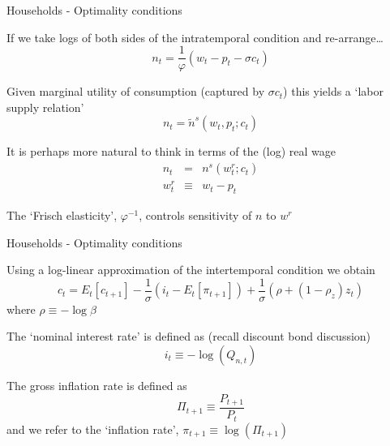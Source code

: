 \begin{frame}{Households - Optimality conditions}

If we take logs of both sides of the intratemporal condition and re-arrange\ldots
\[
n_{t} = \frac{1}{\varphi} \left( w_{t} - p_{t} - \sigma c_{t} \right)
\]

Given marginal utility of consumption (captured by $\sigma c_{t}$) this yields a `labor supply relation'
\[
n_{t} = \tilde{n}^{s}\left(w_{t},p_{t};c_{t}\right)
\]

It is perhaps more natural to think in terms of the (log) real wage
\begin{eqnarray*}
n_{t} 		&=& 		n^{s}\left(w^{r}_{t};c_{t}\right) \\
w^{r}_{t} 	&\equiv& 	w_{t} - p_{t}
\end{eqnarray*}

The `Frisch elasticity', $\varphi^{-1}$, controls sensitivity of $n$ to $w^{r}$
\end{frame}



\begin{frame}{Households - Optimality conditions}

Using a log-linear approximation of the intertemporal condition we obtain
\[
c_{t} = E_{t} \left[ c_{t+1} \right] - \frac{1}{\sigma} \left( i_{t} - E_{t} \left[ \pi_{t+1} \right] \right) + \frac{1}{\sigma} \left( \rho + \left( 1 - \rho_{z} \right) z_{t} \right)
\]
where $\rho \equiv -\log{\beta}$
\vspace{2mm}

The `nominal interest rate' is defined as (recall discount bond discussion)
\[
i_{t} \equiv -\log{(Q_{n,t})}
\]

The gross inflation rate is defined as
\[
\Pi_{t+1} \equiv \frac{P_{t+1}}{P_{t}}
\]
and we refer to the `inflation rate', $\pi_{t+1} \equiv \log{(\Pi_{t+1})}$

\end{frame}



